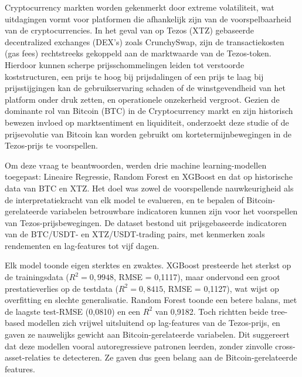 
Cryptocurrency markten worden gekenmerkt door extreme volatiliteit, wat uitdagingen vormt voor platformen die afhankelijk zijn van de voorspelbaarheid van de cryptocurrencies. In het geval van op Tezos (XTZ) gebaseerde decentralized exchanges (DEX’s) zoals CrunchySwap, zijn de transactiekosten (gas fees) rechtstreeks gekoppeld aan de marktwaarde van de Tezos-token. Hierdoor kunnen scherpe prijsschommelingen leiden tot verstoorde koststructuren, een prijs te hoog bij prijsdalingen of een prijs te laag bij prijsstijgingen kan de gebruikservaring schaden of de winstgevendheid van het platform onder druk zetten, en operationele onzekerheid vergroot. Gezien de dominante rol van Bitcoin (BTC) in de Cryptocurrency markt en zijn historisch bewezen invloed op marktsentiment en liquiditeit, onderzoekt deze studie of de prijsevolutie van Bitcoin kan worden gebruikt om kortetermijnbewegingen in de Tezos-prijs te voorspellen.

Om deze vraag te beantwoorden, werden drie machine learning-modellen toegepast: Lineaire Regressie, Random Forest en XGBoost en dat op historische data van BTC en XTZ. Het doel was zowel de voorspellende nauwkeurigheid als de interpretatiekracht van elk model te evalueren, en te bepalen of Bitcoin-gerelateerde variabelen betrouwbare indicatoren kunnen zijn voor het voorspellen van Tezos-prijsbewegingen. De dataset bestond uit prijsgebaseerde indicatoren van de BTC/USDT- en XTZ/USDT-trading pairs, met kenmerken zoals rendementen en lag-features tot vijf dagen.

Elk model toonde eigen sterktes en zwaktes. XGBoost presteerde het sterkst op de trainingsdata ($R^2 = 0{,}9948$, RMSE = 0{,}1117), maar ondervond een groot prestatieverlies op de testdata ($R^2 = 0{,}8415$, RMSE = 0{,}1127), wat wijst op overfitting en slechte generalisatie. Random Forest toonde een betere balans, met de laagste test-RMSE (0{,}0810) en een $R^2$ van 0{,}9182. Toch richtten beide tree-based modellen zich vrijwel uitsluitend op lag-features van de Tezos-prijs, en gaven ze nauwelijks gewicht aan Bitcoin-gerelateerde variabelen. Dit suggereert dat deze modellen vooral autoregressieve patronen leerden, zonder zinvolle cross-asset-relaties te detecteren. Ze gaven dus geen belang aan de Bitcoin-gerelateerde features.

